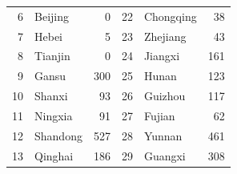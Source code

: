 \documentclass[preprint,12pt]{elsarticle}
\begin{document}
\begin{table}[htbp]
\begin{tabular}{rlrrlr}
    6                           & Beijing        & 0                                                                                                 & 22                          & Chongqing & 38                                                                                                \\
    7                           & Hebei          & 5                                                                                                 & 23                          & Zhejiang  & 43                                                                                                \\
    8                           & Tianjin        & 0                                                                                                 & 24                          & Jiangxi   & 161                                                                                               \\
    9                           & Gansu          & 300                                                                                               & 25                          & Hunan     & 123                                                                                               \\
    10                          & Shanxi         & 93                                                                                                & 26                          & Guizhou   & 117                                                                                               \\
    11                          & Ningxia        & 91                                                                                                & 27                          & Fujian    & 62                                                                                                \\
    12                          & Shandong       & 527                                                                                               & 28                          & Yunnan    & 461                                                                                               \\
    13                          & Qinghai        & 186                                                                                               & 29                          & Guangxi   & 308                                                                                               \\

\end{tabular}
\end{table}
\end{document}
